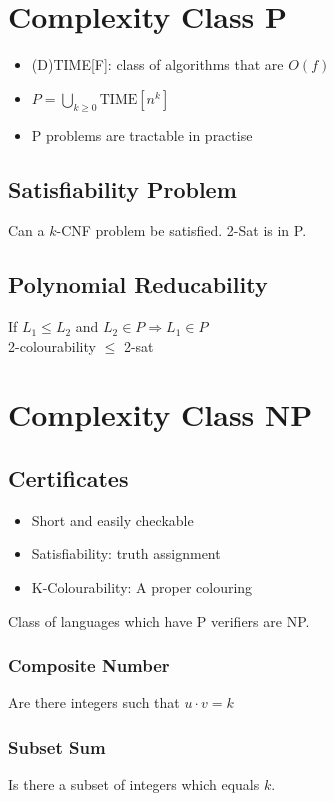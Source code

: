 \section{Complexity Class P}
\begin{itemize}
    \item (D)TIME[F]: class of algorithms that are $O(f)$
    \item $P=\bigcup\limits_{k\geq 0}\text{TIME}[n^k]$
    \item P problems are tractable in practise
\end{itemize}

\subsection{Satisfiability Problem}
Can a $k$-CNF problem be satisfied. 2-Sat is in P.

\subsection{Polynomial Reducability}
If $L_1 \leq L_2$ and $L_2\in P \Rightarrow L_1 \in P$\\
2-colourability $\leq$ 2-sat

\section{Complexity Class NP}
\subsection{Certificates}
\begin{itemize}
    \item Short and easily checkable
    \item Satisfiability: truth assignment
    \item K-Colourability: A proper colouring
\end{itemize}
Class of languages which have P verifiers are NP.

\subsubsection{Composite Number}
Are there integers such that $u\cdot v=k$

\subsubsection{Subset Sum}
Is there  a subset of integers which equals $k$.

